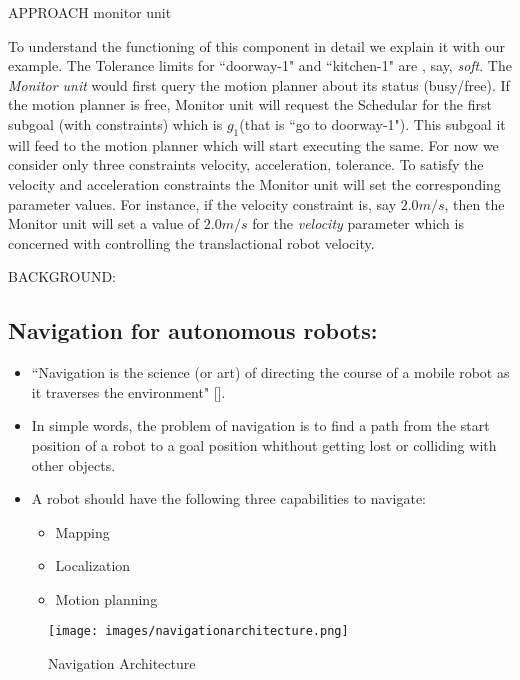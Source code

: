 APPROACH
monitor unit

To understand the functioning of this component in detail we explain it with our example. The Tolerance limits for ``doorway-1" and ``kitchen-1" are , say, \textit{soft}.  
The \textit{Monitor unit} would first query the motion planner about its status (busy/free). If the motion planner is free, Monitor unit will request the Schedular for the first subgoal (with constraints) which is $g_{1}$(that is ``go to doorway-1").
This subgoal it will feed to the motion planner which will start executing the same. For now we consider only three constraints {velocity, acceleration, tolerance}.
To satisfy the velocity and acceleration constraints the Monitor unit will set the corresponding parameter values.
For instance, if the velocity constraint is, say $2.0 m/s$, then the Monitor unit will set a value of $2.0 m/s$ for the \textit{velocity} parameter which is concerned with controlling the translactional robot velocity.  


BACKGROUND:

\subsection{Navigation for autonomous robots:}
\begin{itemize}
 \item ``{Navigation} is the science (or art) of directing the course of a mobile robot as it traverses the environment"  [].
 \item In simple words, the problem of navigation is to find a path from the start position of a robot to a goal position whithout 
 getting lost or colliding with other objects.
 \item A robot should have the following three capabilities to navigate:
 \begin{itemize}
  \item Mapping
  \item Localization
  \item Motion planning
 \end{itemize}
\end{itemize}
\begin{figure}[htbp] %
   \centering
   \texttt{[image: images/navigationarchitecture.png]} 
   \caption{Navigation Architecture}
   \label{Figure: Robot navigation System. The three tasks the robot must accomplish (highlighted in cyan) are in between a high-level layer and a low-level layer.}
\end{figure}

